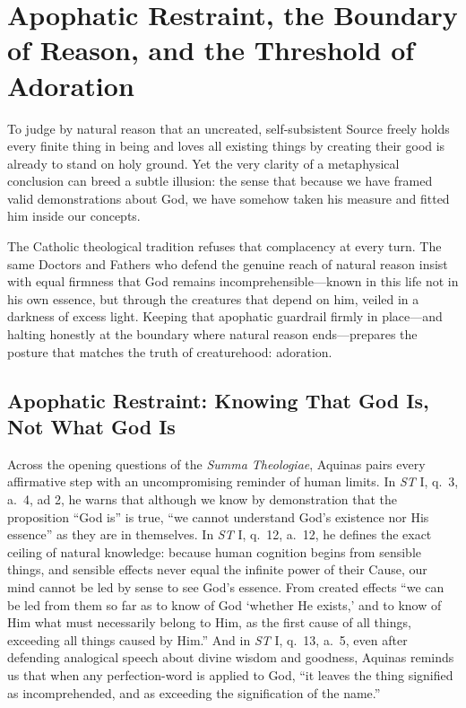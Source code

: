 \section{Apophatic Restraint, the Boundary of Reason, and the Threshold of Adoration}

To judge by natural reason that an uncreated, self-subsistent Source freely holds every finite thing in being and loves all existing things by creating their good is already to stand on holy ground. Yet the very clarity of a metaphysical conclusion can breed a subtle illusion: the sense that because we have framed valid demonstrations about God, we have somehow taken his measure and fitted him inside our concepts.

The Catholic theological tradition refuses that complacency at every turn. The same Doctors and Fathers who defend the genuine reach of natural reason insist with equal firmness that God remains incomprehensible---known in this life not in his own essence, but through the creatures that depend on him, veiled in a darkness of excess light. Keeping that apophatic guardrail firmly in place---and halting honestly at the boundary where natural reason ends---prepares the posture that matches the truth of creaturehood: adoration.

\subsection{Apophatic Restraint: Knowing That God Is, Not What God Is}

Across the opening questions of the \emph{Summa Theologiae}, Aquinas pairs every affirmative step with an uncompromising reminder of human limits. In \emph{ST} I, q.\ 3, a.\ 4, ad 2, he warns that although we know by demonstration that the proposition ``God is'' is true, ``we cannot understand God's existence nor His essence'' as they are in themselves. In \emph{ST} I, q.\ 12, a.\ 12, he defines the exact ceiling of natural knowledge: because human cognition begins from sensible things, and sensible effects never equal the infinite power of their Cause, our mind cannot be led by sense to see God's essence. From created effects ``we can be led from them so far as to know of God `whether He exists,' and to know of Him what must necessarily belong to Him, as the first cause of all things, exceeding all things caused by Him.'' And in \emph{ST} I, q.\ 13, a.\ 5, even after defending analogical speech about divine wisdom and goodness, Aquinas reminds us that when any perfection-word is applied to God, ``it leaves the thing signified as incomprehended, and as exceeding the signification of the name.''

